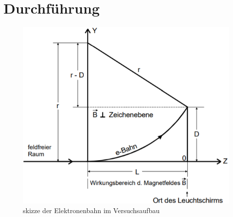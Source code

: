 \section{Durchführung}
\label{sec:Durchführung}

\begin{figure}
    \centering
    \includegraphics[width=\textwidth]{data/skizze_aufbau.png}
    \caption{skizze der Elektronenbahn im Versuchsaufbau}
    \label{fig:skizze}
\end{figure}

